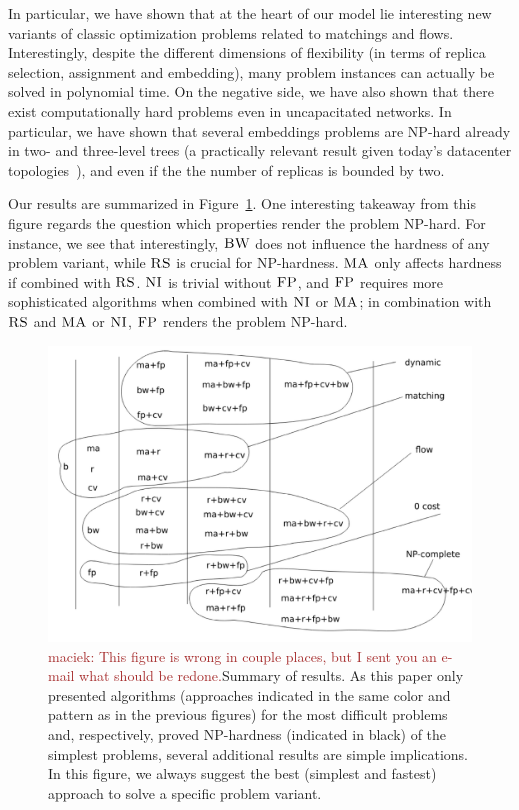 \documentclass[9pt,twocolumn]{scrartcl}
\newcommand{\maciek}[1]{\textcolor{brown}{maciek: #1}}
\newcommand{\CC}{\textsc{NI}}
\newcommand{\FP}{\textsc{FP}}
\newcommand{\RS}{\textsc{RS}}
\newcommand{\BW}{\textsc{BW}}
\newcommand{\MA}{\textsc{MA}}
\begin{document}
In particular, we have shown that
at the heart of our model lie interesting new variants of classic
optimization problems related to matchings and flows. Interestingly, despite the
different dimensions of flexibility (in terms of replica selection, assignment and embedding),
many problem instances can actually be solved in polynomial time.
On the negative side, we have also shown that there exist computationally hard
problems even in uncapacitated networks. In particular,
we have shown that several embeddings problems are NP-hard already in two- and three-level trees
(a practically relevant result given today's datacenter topologies~\cite{fattree}),
and even if the the number of replicas is bounded by two.


Our results are summarized in
Figure~\ref{fig:summary}.
One interesting takeaway from this figure regards
the question which properties render the problem
NP-hard. For instance, we see that interestingly, $\BW$
does not influence the hardness of any problem variant,
while $\RS$ is crucial for NP-hardness.
$\MA$ only affects hardness if combined with $\RS$.
$\CC$ is trivial without $\FP$, and $\FP$ requires
more sophisticated algorithms when combined with $\CC$ or $\MA$;
in combination with $\RS$ and $\MA$ or $\CC$, $\FP$ renders the
problem NP-hard.

\begin{figure}
\includegraphics[width=\columnwidth]{figs/summary}
\caption{\maciek{This figure is wrong in couple places, but I sent you an e-mail what should be redone.}Summary of results. As this paper only presented algorithms (approaches indicated in the same
color and pattern as in the previous figures) for the most
difficult problems and, respectively, proved NP-hardness (indicated in black) of the simplest
problems, several additional results are simple implications. In this figure,
we always suggest the best (simplest and fastest) approach to solve a specific problem variant.}
\label{fig:summary}
\end{figure}
\end{document}
